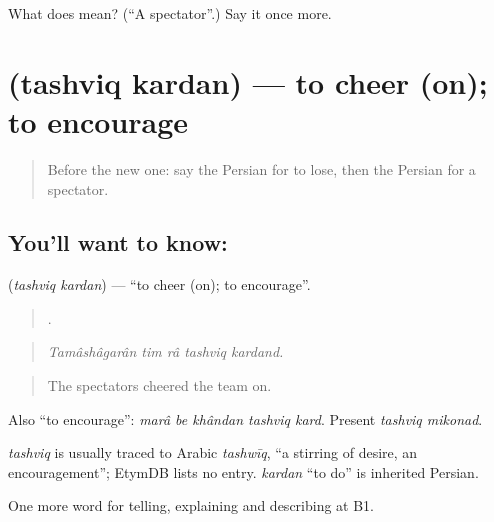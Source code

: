 \begin{tcolorbox}[breakable,colback=teal!4,colframe=teal!35!black,title={Before you move on}]
What does  mean? (\textquotedblleft{}A spectator\textquotedblright{}.) Say it once more.
\end{tcolorbox}
\section[\texorpdfstring{\fa{تشویق} \fa{کردن} (tashviq kardan)}{تشویق کردن (tashviq kardan)}]{  (tashviq kardan) — to cheer (on); to encourage}

\label{lesson:FA-C343-tashviq-kardan}



\begin{quote}
Before the new one: say the Persian for to lose, then the Persian for a spectator.
\end{quote}

\subsection*{You'll want to know:  }
\textbf{ } (\emph{tashviq kardan}) — \textquotedblleft{}to cheer (on); to encourage\textquotedblright{}.

\begin{quote}
    .
\end{quote}

\begin{quote}
\emph{Tamâshâgarân tim râ tashviq kardand.}
\end{quote}

\begin{quote}
The spectators cheered the team on.
\end{quote}

Also \textquotedblleft{}to encourage\textquotedblright{}: \emph{marâ be khândan tashviq kard}. Present \emph{tashviq mikonad}.

\begin{cousinweb}
\emph{tashviq} is usually traced to Arabic \emph{tashwīq}, \textquotedblleft{}a stirring of desire, an encouragement\textquotedblright{}; EtymDB lists no entry. \emph{kardan} \textquotedblleft{}to do\textquotedblright{} is inherited Persian.
\end{cousinweb}

\begin{grammarlens}[title={What you've built}]
One more word for telling, explaining and describing at B1.
\end{grammarlens}

